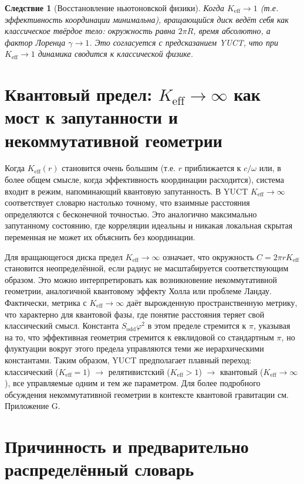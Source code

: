 \documentclass[12pt,a4paper]{article}
\newtheorem{corollary}{Следствие}[section]
\newcommand{\Sodd}{S_{\mathrm{odd}}}
\begin{document}
	\begin{corollary}[Восстановление ньютоновской физики]
		Когда \(K_{\mathrm{eff}} \to 1\) (т.е. эффективность координации минимальна), вращающийся диск ведёт себя как классическое твёрдое тело: окружность равна \(2\pi R\), время абсолютно, а фактор Лоренца \(\gamma \to 1\). Это согласуется с предсказанием YUCT, что при \(K_{\mathrm{eff}} \to 1\) динамика сводится к классической физике.
	\end{corollary}
	
	\section{Квантовый предел: \(K_{\mathrm{eff}} \to \infty\) как мост к запутанности и некоммутативной геометрии}
	\label{sec:quantum-limit}
	
	Когда \(K_{\mathrm{eff}}(r)\) становится очень большим (т.е. \(r\) приближается к \(c/\omega\) или, в более общем смысле, когда эффективность координации расходится), система входит в режим, напоминающий квантовую запутанность. В YUCT \(K_{\mathrm{eff}} \to \infty\) соответствует словарю настолько точному, что взаимные расстояния определяются с бесконечной точностью. Это аналогично максимально запутанному состоянию, где корреляции идеальны и никакая локальная скрытая переменная не может их объяснить без координации.
	
	Для вращающегося диска предел \(K_{\mathrm{eff}} \to \infty\) означает, что окружность \(C = 2\pi r K_{\mathrm{eff}}\) становится неопределённой, если радиус не масштабируется соответствующим образом. Это можно интерпретировать как возникновение некоммутативной геометрии, аналогичной квантовому эффекту Холла или проблеме Ландау. Фактически, метрика с \(K_{\mathrm{eff}} \to \infty\) даёт вырожденную пространственную метрику, что характерно для квантовой фазы, где понятие расстояния теряет свой классический смысл. Константа \(\Sodd \varphi^2\) в этом пределе стремится к \(\pi\), указывая на то, что эффективная геометрия стремится к евклидовой со стандартным \(\pi\), но флуктуации вокруг этого предела управляются теми же иерархическими константами. Таким образом, YUCT предполагает плавный переход: классический (\(K_{\mathrm{eff}}=1\)) \(\rightarrow\) релятивистский (\(K_{\mathrm{eff}}>1\)) \(\rightarrow\) квантовый (\(K_{\mathrm{eff}}\to\infty\)), все управляемые одним и тем же параметром. Для более подробного обсуждения некоммутативной геометрии в контексте квантовой гравитации см. Приложение G.
	
	\section{Причинность и предварительно распределённый словарь}
	\label{sec:causality}
	
\end{document}
